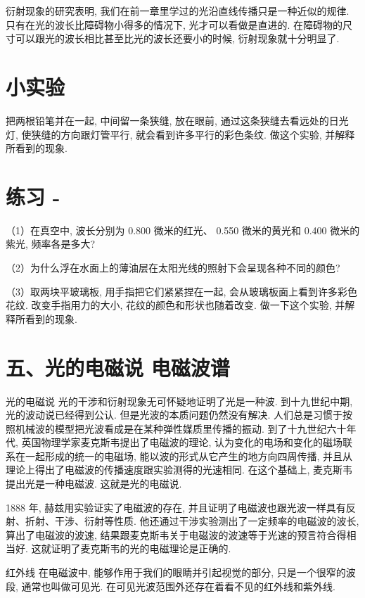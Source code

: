 \documentclass[10pt]{article}
\begin{document}
衍射现象的研究表明, 我们在前一章里学过的光沿直线传播只是一种近似的规律. 只有在光的波长比障碍物小得多的情况下, 光才可以看做是直进的. 在障碍物的尺寸可以跟光的波长相比甚至比光的波长还要小的时候, 衍射现象就十分明显了.

\section*{小实验}

把两根铅笔并在一起, 中间留一条狭缝, 放在眼前, 通过这条狭缝去看远处的日光灯, 使狭缝的方向跟灯管平行, 就会看到许多平行的彩色条纹. 做这个实验, 并解释所看到的现象.

\section*{练习 -}

（1）在真空中, 波长分别为 0.800 微米的红光、 0.550 微米的黄光和 0.400 微米的紫光, 频率各是多大?

（2）为什么浮在水面上的薄油层在太阳光线的照射下会呈现各种不同的颜色?

（3）取两块平玻璃板, 用手指把它们紧紧捏在一起, 会从玻璃板面上看到许多彩色花纹. 改变手指用力的大小, 花纹的颜色和形状也随着改变. 做一下这个实验, 并解释所看到的现象.

\section*{五、光的电磁说 电磁波谱}

光的电磁说 光的干涉和衍射现象无可怀疑地证明了光是一种波. 到十九世纪中期, 光的波动说已经得到公认. 但是光波的本质问题仍然没有解决. 人们总是习惯于按照机械波的模型把光波看成是在某种弹性媒质里传播的振动. 到了十九世纪六十年代, 英国物理学家麦克斯韦提出了电磁波的理论, 认为变化的电场和变化的磁场联系在一起形成的统一的电磁场, 能以波的形式从它产生的地方向四周传播, 并且从理论上得出了电磁波的传播速度跟实验测得的光速相同. 在这个基础上, 麦克斯韦提出光是一种电磁波. 这就是光的电磁说.

1888 年, 赫兹用实验证实了电磁波的存在, 并且证明了电磁波也跟光波一样具有反射、折射、干涉、衍射等性质. 他还通过干涉实验测出了一定频率的电磁波的波长, 算出了电磁波的波速, 结果跟麦克斯韦关于电磁波的波速等于光速的预言符合得相当好. 这就证明了麦克斯韦的光的电磁理论是正确的.

红外线 在电磁波中, 能够作用于我们的眼睛并引起视觉的部分, 只是一个很窄的波段, 通常也叫做可见光. 在可见光波范围外还存在着看不见的红外线和紫外线.
\end{document}
